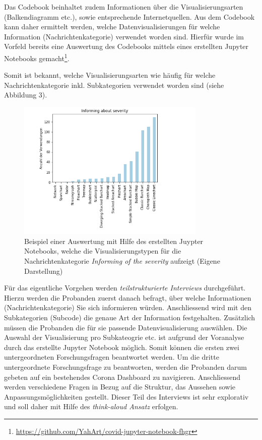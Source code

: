 \documentclass[12pt, oneside]{article}
\begin{document}
Das Codebook beinhaltet zudem Informationen über die Visualisierungsarten (Balkendiagramm etc.), sowie entsprechende Internetquellen. Aus dem Codebook kann daher ermittelt werden, welche Datenvisualisierungen für welche Information (Nachrichtenkategorie) verwendet worden sind. Hierfür wurde im Vorfeld bereits eine Auswertung des Codebooks mittels eines erstellten Jupyter Notebooks gemacht\footnote{\url{https://github.com/YahArt/covid-jupyter-notebook-fhgr}}.

\clearpage
Somit ist bekannt, welche Visualisierungsarten wie häufig für welche Nachrichtenkategorie inkl. Subkategorien verwendet worden sind (siehe Abbildung 3).


\begin{figure}[ht]
	\includegraphics[width=9cm]{images/visualization_types_for_magnitude_spread.png}
	\centering
	\caption{Beispiel einer Auswertung mit Hilfe des erstellten Juypter Notebooks, welche die Visualisierungstypen für die Nachrichtenkategorie \textit{Informing of the severity} aufzeigt (Eigene Darstellung)}
\end{figure}

Für das eigentliche Vorgehen werden \textit{teilstrukturierte Interviews} durchgeführt. Hierzu werden die Probanden zuerst danach befragt, über welche Informationen (Nachrichtenkategorie) Sie sich informieren würden. Anschliessend wird mit den Subkategorien (Subcode) die genaue Art der Information festgehalten. Zusätzlich müssen die Probanden die für sie passende Datenvisualisierung auswählen. Die Auswahl der Visualisierung pro Subkateogrie etc. ist aufgrund der Voranalyse durch das erstellte Jupyter Notebook möglich. Somit können die ersten zwei untergeordneten Forschungsfragen beantwortet werden. Um die dritte untergeordnete Forschungsfrage zu beantworten, werden die Probanden darum gebeten auf ein bestehendes Corona Dashboard zu navigieren. Anschliessend werden verschiedene Fragen in Bezug auf die Struktur, das Aussehen sowie Anpassungsmöglichkeiten gestellt. Dieser Teil des Interviews ist sehr explorativ und soll daher mit Hilfe des \textit{think-aloud Ansatz} erfolgen. 
\end{document}
